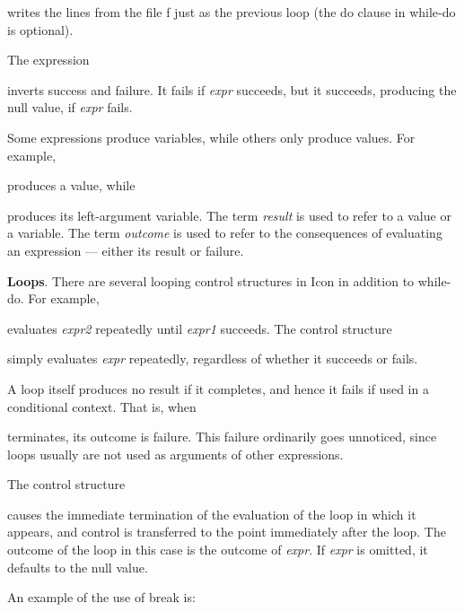 \noindent writes the lines from the file f just as the previous loop
(the do clause in while-do is optional).

The expression


\noindent inverts success and failure. It fails if \textit{expr}
succeeds, but it succeeds, producing the null value, if \textit{expr}
fails.

Some expressions produce variables, while others only produce
values. For example,


\noindent produces a value, while


\noindent produces its left-argument variable. The term
\textit{result} is used to refer to a value or a variable. The term
\textit{outcome }is used to refer to the consequences of evaluating an
expression --- either its result or failure.

\textbf{Loops}.  There are several looping control structures in Icon
in addition to while-do. For example,


\noindent evaluates \textit{expr2} repeatedly until \textit{expr1}
succeeds. The control structure


\noindent simply evaluates \textit{expr} repeatedly, regardless of
whether it succeeds or fails.

A loop itself produces no result if it completes, and hence it fails
if used in a conditional context. That is, when


\noindent terminates, its outcome is failure. This failure ordinarily
goes unnoticed, since loops usually are not used as arguments of other
expressions.

The control structure


\noindent causes the immediate termination of the evaluation of the
loop in which it appears, and control is transferred to the point
immediately after the loop. The outcome of the loop in this case is
the outcome of \textit{expr}. If \textit{expr} is omitted, it defaults
to the null value.

An example of the use of break is:

